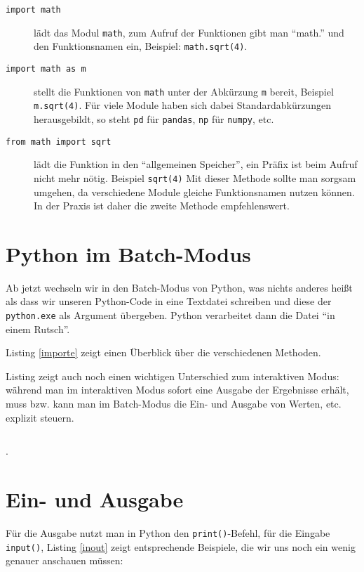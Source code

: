 \documentclass[12pt,ngerman]{scrreprt}
\newcommand{\ta}[1]{\textattachfile[color=1 0 0]{#1}{\faFilePowerpointO}}
\newcommand{\pypyl}[3]{}
\begin{document}
\begin{description}
\item[\texttt{import math}] lädt das Modul \texttt{math}, zum Aufruf der Funktionen gibt man \enquote{math.} und den Funktionsnamen ein, Beispiel: \texttt{math.sqrt(4)}.
\item[\texttt{import math as m}] stellt die Funktionen von \texttt{math} unter der Abkürzung \texttt{m} bereit, Beispiel \texttt{m.sqrt(4)}. Für viele Module haben sich dabei Standardabkürzungen herausgebildt, so steht \texttt{pd} für \texttt{pandas}, \texttt{np} für \texttt{numpy}, etc.
\item[\texttt{from math import sqrt}] lädt die Funktion in den \enquote{allgemeinen Speicher}, ein Präfix ist beim Aufruf nicht mehr nötig. Beispiel \texttt{sqrt(4)} Mit dieser Methode sollte man sorgsam umgehen, da verschiedene Module gleiche Funktionsnamen nutzen können. In der Praxis ist daher die zweite Methode empfehlenswert.
\end{description}

\section{Python im Batch-Modus}

Ab jetzt wechseln wir in den Batch-Modus von Python, was nichts anderes heißt als dass wir unseren Python-Code in eine Textdatei schreiben und diese der \texttt{python.exe} als Argument übergeben. Python verarbeitet dann die Datei \enquote{in einem Rutsch}.


Listing \ref{importe} zeigt einen Überblick über die verschiedenen Methoden.

\pypyl{Überblick der Import-Methoden}{Codes/importe.py}{importe}

Listing zeigt auch noch einen wichtigen Unterschied zum interaktiven Modus: während man im interaktiven Modus sofort eine Ausgabe der Ergebnisse erhält, muss bzw. kann man im Batch-Modus die Ein- und Ausgabe von Werten, etc. explizit steuern. 

\inputminted[bgcolor=bg]{python}{Codes/importe.py}.

\section{Ein- und Ausgabe}

Für die Ausgabe nutzt man in Python den \texttt{print()}-Befehl, für die Eingabe \texttt{input()}, Listing \ref{inout} zeigt entsprechende Beispiele, die wir uns noch ein wenig genauer anschauen müssen:
\end{document}
